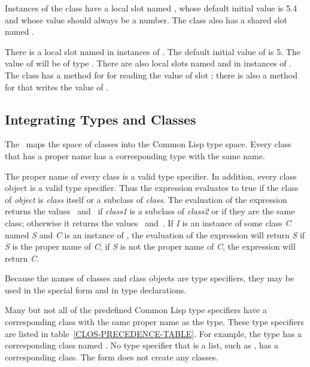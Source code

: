 Instances of the class  have a local slot named , whose default
initial value is 5.4 and whose value should always be a number.
The class  also has a shared slot named .

There is a local slot named  in instances of .  The
default initial value of  is 5.  The value of  will be
of type .  There are also local slots named
 and  in instances of .  The class 
has a method for  for reading the value of slot ;
there is also a method for  that writes the
value of .


\subsection{Integrating Types and Classes} 
\label{Integrating-Types-and-Classes-SECTION} 

The \CLOS\ maps the space of classes into the Common Lisp type space.
Every class that has a proper name has a corresponding type with the same 
name.  

The proper name of every class is a valid type specifier.  In
addition, every class object is a valid type specifier.  Thus the
expression  evaluates to true if the
class of {\it object\/} is {\it class\/} itself or a subclass of {\it
class}.  The evaluation of the expression  returns the values ~and~ if {\it class1\/} is a
subclass of {\it class2\/} or if they are the same class; otherwise it
returns the values ~and~.  If {\it I} is an instance of some class
{\it C} named {\it S} and {\it C} is an instance of , the
evaluation of the expression  will return {\it S} if
{\it S} is the proper name of {\it C\/}; if {\it S} is not the proper
name of {\it C}, the expression  will
return {\it C}.

Because the names of classes and class objects are type specifiers, they may
be used in the special form  and in type declarations.

Many but not all of the predefined Common Lisp type specifiers have a
corresponding class with the same proper name as the type.  These type
specifiers are listed in table~\ref{CLOS-PRECEDENCE-TABLE}.  For example, the
type  has a corresponding class named .  No type specifier
that is a list, such as , has a corresponding
class. The form  does not create any classes.

